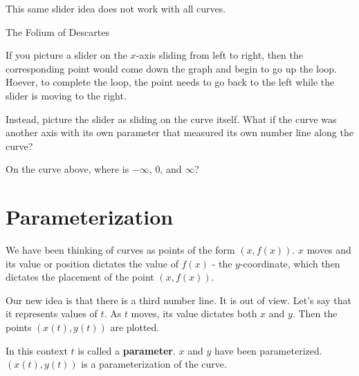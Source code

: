 \documentclass{ximera}
\begin{document}
This same slider idea does not work with all curves.





The Folium of Descartes





\begin{center}
\end{center}


If you picture a slider on the $x$-axis sliding from left to right, then the corresponding point would come down the graph and begin to go up the loop.  Hoever, to complete the loop, the point needs to go back to the left while the slider is moving to the right.


Instead, picture the slider as sliding on the curve itself. What if the curve was another axis with its own parameter that measured its own number line along the curve?

On the curve above, where is $-\infty$, $0$, and $\infty$?







\section{Parameterization}




We have been thinking of curves as points of the form $(x, f(x))$. $x$ moves and its value or position dictates the value of $f(x)$ - the $y$-coordinate, which then dictates the placement of the point $(x, f(x))$.


Our new idea is that there is a third number line.  It is out of view.  Let's say that it represents values of $t$.  As $t$ moves, its value dictates both $x$ and $y$. Then the points $(x(t), y(t))$ are plotted.

In this context $t$ is called a \textbf{parameter}.  $x$ and $y$ have been parameterized.  $(x(t), y(t))$ is a parameterization of the curve.
\end{document}
